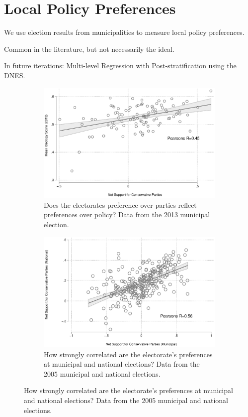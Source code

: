 \documentclass[10pt,aspectratio=169]{beamer}
\begin{document}
\section{Local Policy Preferences}

\begin{frame}
We use election results from municipalities to measure local policy preferences.

\vspace{0.2in}
Common in the literature, but not necessarily the ideal.

\vspace{0.2in}
In future iterations: Multi-level Regression with Post-stratification using the DNES.
\end{frame}

\begin{frame}
\begin{figure}
	\begin{subfigure}{0.45\textwidth}
		\includegraphics[width=1\textwidth]{images/validation.eps}
		\caption{Does the electorates preference over parties reflect preferences over policy? Data from the 2013 municipal election.} \label{validation1}
	\end{subfigure}  \hfill
	\begin{subfigure}{0.45\textwidth}
		\includegraphics[width=1\textwidth]{images/validation2.eps}
		\caption{How strongly correlated are the electorate's preferences at municipal and national elections? Data from the 2005 municipal and national elections.} \label{validation2}
	\end{subfigure}
\end{figure}
\end{frame}
\end{document}
